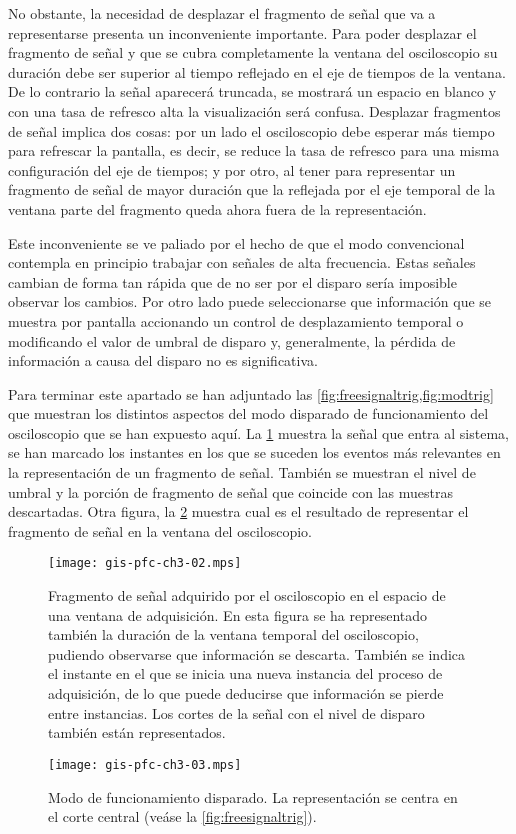No obstante, la necesidad de desplazar el fragmento de señal que va a
representarse presenta un inconveniente importante. Para poder desplazar el
fragmento de señal y que se cubra completamente la ventana del osciloscopio
su duración debe ser superior al tiempo reflejado en el eje de tiempos de
la ventana. De lo contrario la señal aparecerá truncada, se mostrará un
espacio en blanco y con una tasa de refresco alta la visualización será
confusa. Desplazar fragmentos de señal implica dos cosas: por un lado el
osciloscopio debe esperar más tiempo para refrescar la pantalla, es decir,
se reduce la tasa de refresco para una misma configuración del eje de
tiempos; y por otro, al tener para representar un fragmento de señal de
mayor duración que la reflejada por el eje temporal de la ventana parte del
fragmento queda ahora fuera de la representación.

Este inconveniente se ve paliado por el hecho de que el modo convencional
contempla en principio trabajar con señales de alta frecuencia. Estas
señales cambian de forma tan rápida que de no ser por el disparo sería
imposible observar los cambios. Por otro lado puede seleccionarse que
información que se muestra por pantalla accionando un control de
desplazamiento temporal o modificando el valor de umbral de disparo y,
generalmente, la pérdida de información a causa del disparo no es
significativa.

Para terminar este apartado se han adjuntado las
\cref{fig:freesignaltrig,fig:modtrig} que muestran los distintos aspectos
del modo disparado de funcionamiento del osciloscopio que se han expuesto
aquí. La \cref{fig:freesignaltrig} muestra la señal que entra al sistema,
se han marcado los instantes en los que se suceden los eventos más
relevantes en la representación de un fragmento de señal. También se
muestran el nivel de umbral y la porción de fragmento de señal que coincide
con las muestras descartadas. Otra figura, la \cref{fig:modtrig} muestra
cual es el resultado de representar el fragmento de señal en la ventana del
osciloscopio.

\begin{figure}
	\begin{center}
		\texttt{[image: gis-pfc-ch3-02.mps]}
	\end{center}
	\caption[Fragmento de señal adquirido por el osciloscopio en el
	espacio de una ventana de adquisición]{Fragmento de señal adquirido
	por el osciloscopio en el espacio de una ventana de adquisición. En
	esta figura se ha representado también la duración de la ventana
	temporal del osciloscopio, pudiendo observarse que información se
	descarta. También se indica el instante en el que se inicia una
	nueva instancia del proceso de adquisición, de lo que puede
	deducirse que información se pierde entre instancias. Los cortes de
	la señal con el nivel de disparo también están representados.}
	\label{fig:freesignaltrig}
\end{figure}

\begin{figure}
	\begin{center}
		\texttt{[image: gis-pfc-ch3-03.mps]}
	\end{center}
	\caption[Modo de funcionamiento disparado]{Modo de funcionamiento
	disparado. La representación se centra en el corte central (veáse
	la \vref{fig:freesignaltrig}).}
	\label{fig:modtrig}
\end{figure}
